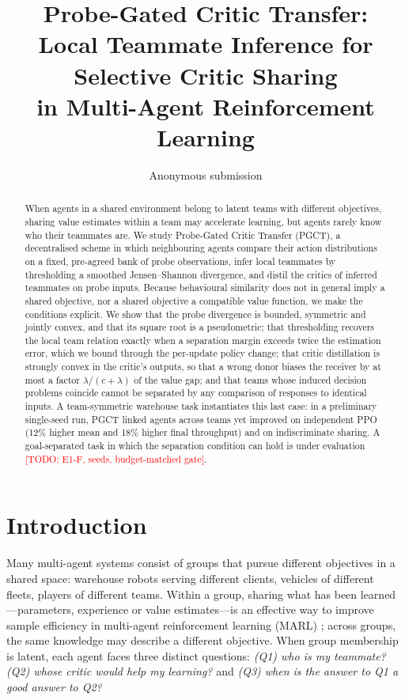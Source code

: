 \documentclass{article}
\title{Probe-Gated Critic Transfer:\\ Local Teammate Inference for Selective Critic Sharing\\ in Multi-Agent Reinforcement Learning}
\author{Anonymous submission}
\theoremstyle{remark}
\newcommand{\todo}[1]{\textcolor{red}{[TODO: #1]}}
\newcommand{\ours}{PGCT}
\begin{document}
\maketitle

\begin{abstract}
When agents in a shared environment belong to latent teams with different objectives, sharing value estimates
within a team may accelerate learning, but agents rarely know who their teammates are. We study Probe-Gated Critic
Transfer (\ours{}), a decentralised scheme in which neighbouring agents compare their action distributions on a fixed,
pre-agreed bank of probe observations, infer local teammates by thresholding a smoothed Jensen--Shannon divergence, and
distil the critics of inferred teammates on probe inputs. Because behavioural similarity does not in general imply a
shared objective, nor a shared objective a compatible value function, we make the conditions explicit. We show that the
probe divergence is bounded, symmetric and jointly convex, and that its square root is a pseudometric; that thresholding
recovers the local team relation exactly when a separation margin exceeds twice the estimation error, which we bound
through the per-update policy change; that critic distillation is strongly convex in the critic's outputs, so that a wrong
donor biases the receiver by at most a factor $\lambda/(c+\lambda)$ of the value gap; and that teams whose induced
decision problems coincide cannot be separated by any comparison of responses to identical inputs. A team-symmetric
warehouse task instantiates this last case: in a preliminary single-seed run, \ours{} linked agents across teams yet
improved on independent PPO (12\% higher mean and 18\% higher final throughput) and on indiscriminate sharing. A
goal-separated task in which the separation condition can hold is under evaluation \todo{E1-F, seeds, budget-matched gate}.
\end{abstract}

\section{Introduction}
Many multi-agent systems consist of groups that pursue different objectives in a shared space: warehouse robots serving
different clients, vehicles of different fleets, players of different teams. Within a group, sharing what has been
learned---parameters, experience or value estimates---is an effective way to improve sample efficiency in multi-agent
reinforcement learning (MARL) \cite{christianos2020seac,christianos2021seps}; across groups, the same knowledge may
describe a different objective. When group membership is latent, each agent faces three distinct questions:
\emph{(Q1) who is my teammate?} \emph{(Q2) whose critic would help my learning?} and \emph{(Q3) when is the answer to Q1 a
good answer to Q2?}
\end{document}
